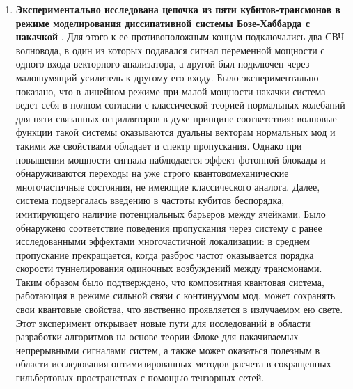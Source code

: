 \documentclass[14pt, a4paper]{extarticle}
\begin{document}
\begin{enumerate}
\item \textbf{Экспериментально исследована цепочка из пяти кубитов\hyp трансмонов в режиме моделирования диссипативной системы Бозе-Хаббарда с накачкой} . Для этого к ее противоположным концам подключались два СВЧ-волновода, в один из которых подавался сигнал переменной мощности с одного входа векторного анализатора, а другой был подключен через малошумящий усилитель к другому его входу. Было экспериментально показано, что в линейном режиме при малой мощности накачки система ведет себя в полном согласии с классической теорией нормальных колебаний для пяти связанных осцилляторов в духе принципе соответствия: волновые функции такой системы оказываются дуальны векторам нормальных мод и такими же свойствами обладает и спектр пропускания. Однако при повышении мощности сигнала наблюдается эффект фотонной блокады и обнаруживаются переходы на уже строго квантовомеханические многочастичные состояния, не имеющие классического аналога. Далее, система подвергалась введению в частоты кубитов беспорядка, имитирующего наличие потенциальных барьеров между ячейками. Было обнаружено соответствие поведения пропускания через систему с ранее исследованными эффектами многочастичной локализации: в среднем пропускание прекращается, когда разброс частот оказывается порядка скорости туннелирования одиночных возбуждений между трансмонами. Таким образом было подтверждено, что композитная квантовая система, работающая в режиме сильной связи с континуумом мод, может сохранять свои квантовые свойства, что явственно проявляется в излучаемом ею свете. Этот эксперимент открывает новые пути для исследований в области разработки алгоритмов на основе теории Флоке для накачиваемых непрерывными сигналами систем, а также может оказаться полезным в области исследования оптимизированных методов расчета в сокращенных гильбертовых пространствах с помощью тензорных сетей.

\end{enumerate}

\continuouslabelsfalse
{}




\end{document}
